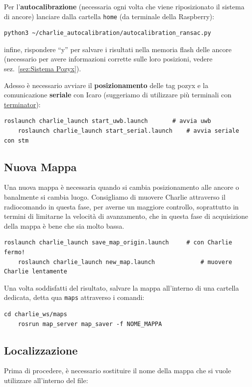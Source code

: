 Per l'\textbf{autocalibrazione} (necessaria ogni volta che viene riposizionato il sistema di ancore) lanciare 
dalla cartella \texttt{home} (da terminale della Raspberry):
\begin{lstlisting}[style=bash]
	python3 ~/charlie_autocalibration/autocalibration_ransac.py
\end{lstlisting}
infine, rispondere ``y'' per salvare i risultati nella memoria flash delle ancore (necessario per avere informazioni corrette sulle loro posizioni, vedere sez.~\ref{sez:Sistema Pozyx}).

Adesso è necessario avviare il \textbf{posizionamento} delle tag pozyx e la comunicazione \textbf{seriale} con Icaro (suggeriamo di utilizzare più terminali con \href{https://terminator-gtk3.readthedocs.io/en/latest/}{terminator}):
\begin{lstlisting}[style=bash]
	roslaunch charlie_launch start_uwb.launch		# avvia uwb
	roslaunch charlie_launch start_serial.launch	# avvia seriale con stm
\end{lstlisting}

\subsection*{Nuova Mappa}
Una nuova mappa è necessaria quando si cambia posizionamento alle ancore o banalmente si cambia luogo. Consigliamo di muovere Charlie attraverso il radiocomando in questa fase, per averne un maggiore controllo, soprattutto in termini di limitarne la velocità di avanzamento, che in questa fase di acquisizione della mappa è bene che sia molto bassa.
\begin{lstlisting}[style=bash]
	roslaunch charlie_launch save_map_origin.launch		# con Charlie fermo!
	roslaunch charlie_launch new_map.launch 			# muovere Charlie lentamente
\end{lstlisting}

Una volta soddisfatti del risultato, salvare la mappa all'interno di una cartella dedicata, detta qua \verb|maps| attraverso i comandi:
\begin{lstlisting}[style=bash]
	cd charlie_ws/maps
	rosrun map_server map_saver -f NOME_MAPPA
\end{lstlisting}

\subsection*{Localizzazione}
Prima di procedere, è necessario sostituire il nome della mappa che si vuole utilizzare all'interno del file:

